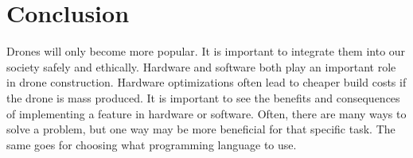 \documentclass[a4paper, 11pt]{article} %
\begin{document}

\section*{Conclusion}

Drones will only become more popular. It is important to integrate them into our society safely and ethically. Hardware and software both play an important role in drone construction. Hardware optimizations often lead to cheaper build costs if the drone is mass produced. It is important to see the benefits and consequences of implementing a feature in hardware or software. Often, there are many ways to solve a problem, but one way may be more beneficial for that specific task. The same goes for choosing what programming language to use.



{}

\end{document}

